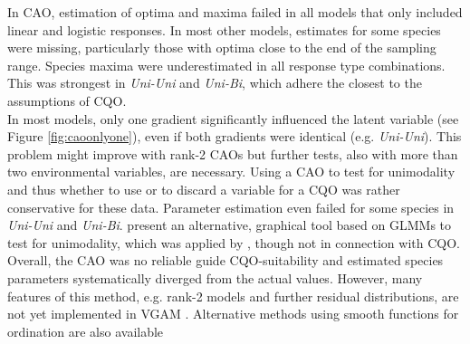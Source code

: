 %
%
	In CAO, estimation of optima and maxima failed in all models that only included linear and logistic responses.
	In most other models, estimates for some species were missing, particularly those with optima close to the end of the sampling range. 
	Species maxima were underestimated in all response type combinations.
	This was strongest in \textit{Uni-Uni} and \textit{Uni-Bi}, which adhere the closest to the assumptions of CQO.\\ 
	In most models, only one gradient significantly influenced the latent variable (see Figure \ref{fig:caoonlyone}), even if both gradients were identical (e.g. \textit{Uni-Uni}). 
	This problem might improve with rank-2 CAOs but further tests, also with more than two environmental variables, are necessary.  
	Using a CAO to test for unimodality and thus whether to use or to discard a variable for a CQO was rather conservative for these data.
	Parameter estimation even failed for some species in \textit{Uni-Uni} and \textit{Uni-Bi}. 
	\citet{Jamil2013} present an alternative, graphical tool based on GLMMs to test for unimodality, which was applied by \citet{jamil2014unimodal}, though not in connection with CQO. 
	Overall, the CAO was no reliable guide CQO-suitability and estimated species parameters systematically diverged from the actual values. 
	However, many features of this method, e.g. rank-2 models and further residual distributions, are not yet implemented in VGAM  \citep{yee2015vector}.
	Alternative methods using smooth functions for ordination are also available \citep[e.g.][]{schnabel2012modeling}\\


